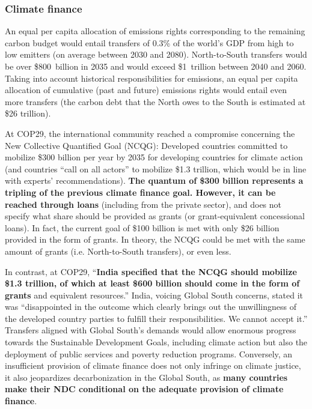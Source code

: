 \documentclass[12pt,english]{article}
\begin{document}
\subsubsection{Climate finance\label{subsubsec:finance}}

An equal per capita allocation of emissions rights corresponding to the remaining carbon budget would entail transfers of 0.3\% of the world's GDP from high to low emitters (on average between 2030 and 2080). North-to-South transfers would be over \$800~billion in 2035 and would exceed \$1~trillion between 2040 and 2060. %
Taking into account historical responsibilities for emissions, an equal per capita allocation of cumulative (past and future) emissions rights would entail even more transfers (the carbon debt that the North owes to the South is estimated at \$26 trillion\cite{fabre_global_2024,fanning_compensation_2023}). 

At COP29, the international community reached a compromise concerning the New Collective Quantified Goal (NCQG): Developed countries committed to mobilize \$300 billion per year by 2035 for developing countries for climate action (and countries ``call on all actors'' to mobilize \$1.3 trillion, which would be in line with experts' recommendations\cite{unfccc_new_2024,songwe_raising_2024}). \textbf{The quantum of \$300 billion represents a tripling of the previous climate finance goal. However, it can be reached through loans} (including from the private sector), and does not specify what share should be provided as grants (or grant-equivalent concessional loans). In fact, the current goal of \$100 billion is met with only \$26 billion provided in the form of grants.\cite{oecd_climate_2024} 
In theory, the NCQG could be met with the same amount of grants (i.e. North-to-South transfers), or even less. 

In contrast, at COP29, ``\textbf{India specified that the NCQG should mobilize \$1.3 trillion, of which at least \$600 billion should come in the form of grants} and equivalent resources.''\cite{earth_negotiations_bulletin_daily_2024} India, voicing Global South concerns, stated it was ``disappointed in the outcome which clearly brings out the unwillingness of the developed country parties to fulfill their responsibilities. We cannot accept it.'' Transfers aligned with Global South's demands would allow enormous progress towards the Sustainable Development Goals, including climate action but also the deployment of public services and poverty reduction programs. Conversely, an insufficient provision of climate finance does not only infringe on climate justice, it also jeopardizes decarbonization in the Global South, as \textbf{many countries make their NDC conditional on the adequate provision of climate finance}. 
\end{document}
